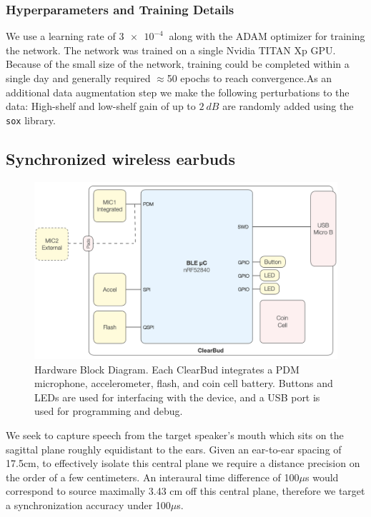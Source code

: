 \documentclass [11pt, proquest] {uwthesis}[2020/02/24]
\begin{document}
\subsubsection{Hyperparameters and Training Details}

 We use a learning rate of $\SI{3e-4}{}$ along with the ADAM optimizer  \cite{kingma2014adam} for training the network. The network was trained on a single Nvidia TITAN Xp GPU. Because of the small size of the network, training could be completed within a single day and generally required $\approx$50 epochs to reach convergence.As an additional data augmentation step we make the following perturbations to the data: High-shelf and low-shelf gain of up to $\SI{2}~{dB}$ are randomly added using the \texttt{sox} library.

\subsection{Synchronized wireless earbuds}

\begin{figure}
\vskip -0.1in
\centering
\includegraphics[width=0.75\linewidth]{CB_figures/ClearBud-Block-Diagram.png}
\caption{Hardware Block Diagram. Each ClearBud integrates a PDM microphone, accelerometer, flash, and coin cell battery. Buttons and LEDs are used for interfacing with the device, and a USB port is used for programming and debug.}
\vskip -0.2in
\label{fig:block-diagram}
\end{figure}

\label{sec:system}
 We seek to capture speech from the target speaker's mouth which sits on the sagittal plane roughly  equidistant to the ears. Given an ear-to-ear spacing of 17.5cm, to effectively isolate this central plane we require a distance precision on the order of a few centimeters.
An interaural time difference of 100$\mu$s  would correspond to source maximally 3.43 cm off this central plane, therefore we target a synchronization accuracy under 100$\mu$s.
\end{document}
